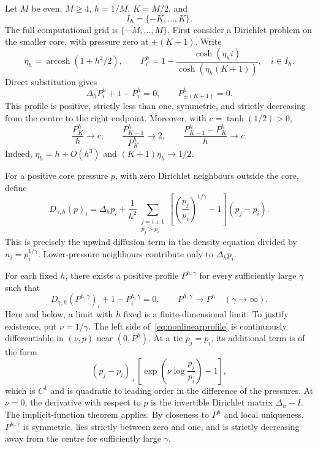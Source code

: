 \documentclass[11pt,a4paper]{article}
\theoremstyle{remark}
\begin{document}
Let $M$ be even, $M\ge4$, $h=1/M$, $K=M/2$, and
\[
 I_h=\{-K,\ldots,K\}.
\]
The full computational grid is $\{-M,\ldots,M\}$. First consider a Dirichlet problem on the smaller core, with pressure zero at $\pm(K+1)$. Write
\[
 \eta_h=\operatorname{arcosh}(1+h^2/2),\qquad
 P_i^h=1-\frac{\cosh(\eta_h i)}{\cosh(\eta_h(K+1))},\quad i\in I_h.
\]
Direct substitution gives
\begin{equation}\label{eq:linprofile}
 \Delta_hP_i^h+1-P_i^h=0,\qquad P^h_{\pm(K+1)}=0.
\end{equation}
This profile is positive, strictly less than one, symmetric, and strictly decreasing from the centre to the right endpoint. Moreover, with $c=\tanh(1/2)>0$,
\begin{equation}\label{eq:edgeasymp}
 \frac{P_K^h}{h}\longrightarrow c,\qquad
 \frac{P_{K-1}^h}{P_K^h}\longrightarrow2,\qquad
 \frac{P_{K-1}^h-P_K^h}{h}\longrightarrow c.
\end{equation}
Indeed, $\eta_h=h+O(h^3)$ and $(K+1)\eta_h\to1/2$.

For a positive core pressure $p$, with zero Dirichlet neighbours outside the core, define
\begin{equation}\label{eq:Dgamma}
 D_{\gamma,h}(p)_i=
 \Delta_hp_i+\frac1{h^2}\sum_{\substack{j=i\pm1\\p_j>p_i}}
 \left[\left(\frac{p_j}{p_i}\right)^{1/\gamma}-1\right](p_j-p_i).
\end{equation}
This is precisely the upwind diffusion term in the density equation divided by $n_i=p_i^{1/\gamma}$. Lower-pressure neighbours contribute only to $\Delta_hp_i$.

For each fixed $h$, there exists a positive profile $P^{h,\gamma}$ for every sufficiently large $\gamma$ such that
\begin{equation}\label{eq:nonlinearprofile}
 D_{\gamma,h}(P^{h,\gamma})_i+1-P_i^{h,\gamma}=0,
 \qquad P^{h,\gamma}\longrightarrow P^h\quad(\gamma\to\infty).
\end{equation}
Here and below, a limit with $h$ fixed is a finite-dimensional limit. To justify existence, put $\nu=1/\gamma$. The left side of~\eqref{eq:nonlinearprofile} is continuously differentiable in $(\nu,p)$ near $(0,P^h)$. At a tie $p_j=p_i$, its additional term is of the form
\[
 (p_j-p_i)_+\left[\exp\!\left(\nu\log\frac{p_j}{p_i}\right)-1\right],
\]
which is $C^1$ and is quadratic to leading order in the difference of the pressures. At $\nu=0$, the derivative with respect to $p$ is the invertible Dirichlet matrix $\Delta_h-I$. The implicit-function theorem applies. By closeness to $P^h$ and local uniqueness, $P^{h,\gamma}$ is symmetric, lies strictly between zero and one, and is strictly decreasing away from the centre for sufficiently large $\gamma$.
\end{document}
